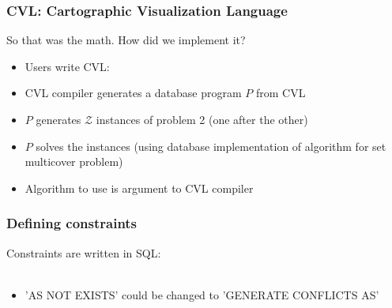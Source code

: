 \documentclass{beamer}
\begin{document}
\frame
{
  \frametitle{CVL: Cartographic Visualization Language}
  So that was the math. How did we implement it?
  \begin{itemize}
  \item Users write CVL:
  \end{itemize}
  
  \begin{itemize}
  \item CVL compiler generates a database program $P$ from CVL
  \item $P$ generates $\mathcal{Z}$ instances of problem 2 (one after the other)
  \item $P$ solves the instances (using database implementation of algorithm for set multicover problem)
  \item Algorithm to use is argument to CVL compiler
  \end{itemize}
}

\frame
{
  \frametitle{Defining constraints}
  Constraints are written in SQL: \\
  \\
  \begin{itemize}
  \item 'AS NOT EXISTS' could be changed to 'GENERATE CONFLICTS AS'
  \end{itemize}
}
\end{document}
